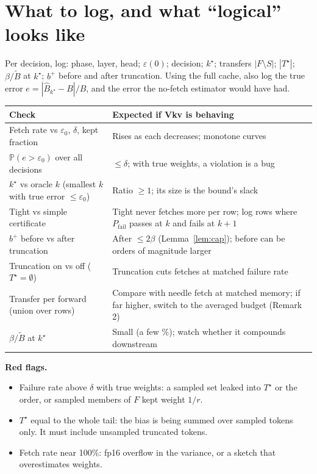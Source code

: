 \documentclass[11pt]{article}
\newcommand{\eps}{\varepsilon}
\theoremstyle{definition}
\theoremstyle{remark}
\begin{document}
\section{What to log, and what ``logical'' looks like}

Per decision, log: phase, layer, head; $\eps(0)$; decision; $k^\star$; transfers $|F \setminus S|$; $|T^\star|$;
$\beta/\tilde B$ at $k^\star$; $b^+$ before and after truncation. Using the full cache, also log the true error
$e = |\hat B_{k^\star} - B|/B$, and the error the no-fetch estimator would have had.

\begin{center}\small
\begin{tabular}{p{}p{}}\toprule
Check & Expected if Vkv is behaving \\ \midrule
Fetch rate vs $\eps_0$, $\delta$, kept fraction & Rises as each decreases; monotone curves \\
$\mathbb P(e > \eps_0)$ over all decisions & $\le \delta$; with true weights, a violation is a bug \\
$k^\star$ vs oracle $k$ (smallest $k$ with true error $\le \eps_0$) & Ratio $\ge 1$; its size is the bound's slack \\
Tight vs simple certificate & Tight never fetches more per row; log rows where $P_{\mathrm{fail}}$ passes at $k$ and fails at
$k + 1$ \\
$b^+$ before vs after truncation & After $\le 2\beta$ (Lemma~\ref{lem:cap}); before can be orders of magnitude larger \\
Truncation on vs off ($T^\star = \emptyset$) & Truncation cuts fetches at matched failure rate \\
Transfer per forward (union over rows) & Compare with needle fetch at matched memory; if far higher, switch to the averaged
budget (Remark 2) \\
$\beta/\tilde B$ at $k^\star$ & Small (a few \%); watch whether it compounds downstream \\ \bottomrule
\end{tabular}
\end{center}

\textbf{Red flags.}
\begin{itemize}
\item Failure rate above $\delta$ with true weights: a sampled set leaked into $T^\star$ or the order, or sampled members of
$F$ kept weight $1/r$.
\item $T^\star$ equal to the whole tail: the bias is being summed over sampled tokens only. It must include unsampled truncated
tokens.
\item Fetch rate near 100\%: fp16 overflow in the variance, or a sketch that overestimates weights.
\end{itemize}
\end{document}
